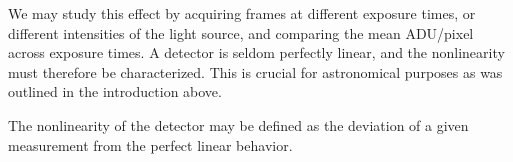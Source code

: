 \documentclass[../main.tex]{subfiles}
\begin{document}
	We may study this effect by acquiring frames at different exposure times, or different intensities of the light source, and comparing the mean ADU/pixel across exposure times. A detector is seldom perfectly linear, and the nonlinearity must therefore be characterized. This is crucial for astronomical purposes as was outlined in the introduction above.
	
	The nonlinearity of the detector may be defined as the deviation of a given measurement from the perfect linear behavior.
	
\end{document}
